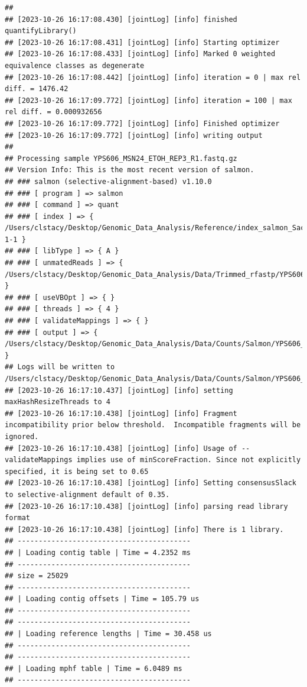 \documentclass[
]{book}
\begin{document}
\begin{verbatim}
## 
## [2023-10-26 16:17:08.430] [jointLog] [info] finished quantifyLibrary()
## [2023-10-26 16:17:08.431] [jointLog] [info] Starting optimizer
## [2023-10-26 16:17:08.433] [jointLog] [info] Marked 0 weighted equivalence classes as degenerate
## [2023-10-26 16:17:08.442] [jointLog] [info] iteration = 0 | max rel diff. = 1476.42
## [2023-10-26 16:17:09.772] [jointLog] [info] iteration = 100 | max rel diff. = 0.000932656
## [2023-10-26 16:17:09.772] [jointLog] [info] Finished optimizer
## [2023-10-26 16:17:09.772] [jointLog] [info] writing output 
## 
## Processing sample YPS606_MSN24_ETOH_REP3_R1.fastq.gz
## Version Info: This is the most recent version of salmon.
## ### salmon (selective-alignment-based) v1.10.0
## ### [ program ] => salmon 
## ### [ command ] => quant 
## ### [ index ] => { /Users/clstacy/Desktop/Genomic_Data_Analysis/Reference/index_salmon_Saccharomyces_cerevisiae.R64-1-1 }
## ### [ libType ] => { A }
## ### [ unmatedReads ] => { /Users/clstacy/Desktop/Genomic_Data_Analysis/Data/Trimmed_rfastp/YPS606_MSN24_ETOH_REP3_R1.fastq.gz }
## ### [ useVBOpt ] => { }
## ### [ threads ] => { 4 }
## ### [ validateMappings ] => { }
## ### [ output ] => { /Users/clstacy/Desktop/Genomic_Data_Analysis/Data/Counts/Salmon/YPS606_MSN24_ETOH_REP3_R1.fastq.gz_quant }
## Logs will be written to /Users/clstacy/Desktop/Genomic_Data_Analysis/Data/Counts/Salmon/YPS606_MSN24_ETOH_REP3_R1.fastq.gz_quant/logs
## [2023-10-26 16:17:10.437] [jointLog] [info] setting maxHashResizeThreads to 4
## [2023-10-26 16:17:10.438] [jointLog] [info] Fragment incompatibility prior below threshold.  Incompatible fragments will be ignored.
## [2023-10-26 16:17:10.438] [jointLog] [info] Usage of --validateMappings implies use of minScoreFraction. Since not explicitly specified, it is being set to 0.65
## [2023-10-26 16:17:10.438] [jointLog] [info] Setting consensusSlack to selective-alignment default of 0.35.
## [2023-10-26 16:17:10.438] [jointLog] [info] parsing read library format
## [2023-10-26 16:17:10.438] [jointLog] [info] There is 1 library.
## -----------------------------------------
## | Loading contig table | Time = 4.2352 ms
## -----------------------------------------
## size = 25029
## -----------------------------------------
## | Loading contig offsets | Time = 105.79 us
## -----------------------------------------
## -----------------------------------------
## | Loading reference lengths | Time = 30.458 us
## -----------------------------------------
## -----------------------------------------
## | Loading mphf table | Time = 6.0489 ms
## -----------------------------------------

\end{verbatim}
\end{document}
